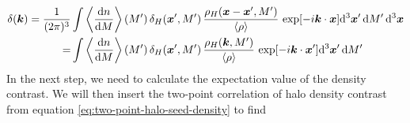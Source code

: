 \documentclass[../main.tex]{subfiles}
\begin{document}
\begin{align}
    \delta(\boldsymbol{k}) = \frac{1}{(2\pi)^3}&\int \left\langle  \frac{\mathrm{d} n}{\mathrm{d} M} \right\rangle(M')\,\delta_H(\boldsymbol{x}',M') \,\frac{\rho_H(\boldsymbol{x}-\boldsymbol{x}',M')}{\langle \rho \rangle}\,\exp[{-i\boldsymbol{k}\cdot\boldsymbol{x}}] \mathrm{d}^3 \boldsymbol{x}' \,\mathrm{d} M'\,\mathrm{d}^3\boldsymbol{x}\\
    =&\int \left\langle  \frac{\mathrm{d} n}{\mathrm{d} M} \right\rangle(M')\,\delta_H(\boldsymbol{x}',M') \,\frac{\rho_H(\boldsymbol{k},M')}{\langle \rho \rangle}\,\exp[{-i\boldsymbol{k}\cdot\boldsymbol{x}'}] \mathrm{d}^3 \boldsymbol{x}' \,\mathrm{d} M'
\end{align} 
In the next step, we need to calculate the expectation value of the density contrast. We will then insert the two-point correlation of halo density contrast from equation \ref{eq:two-point-halo-seed-density} to find
\end{document}
